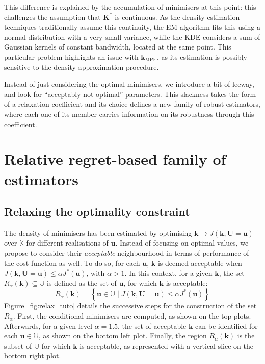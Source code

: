 \documentclass[preprint, 1p]{elsarticle}
\newcommand{\kmpe}{{\mathbf{k}}_{\mathrm{MPE}}}
\newcommand{\Kspace}{\mathbb{K}}
\newcommand{\Uspace}{\mathbb{U}}
\newcommand{\elise}[1]{{\itshape\color{red} ({#1})}}
\begin{document}
This difference is explained by the accumulation of minimisers at this point: this challenges the assumption that $\mathbf{K}^*$ is continuous. As the density estimation techniques traditionally assume this continuity, the EM algorithm fits this using a normal distribution with a very small variance, while the KDE considers a sum of Gaussian kernels of constant bandwidth, located at the same point. This particular problem highlights an issue with $\kmpe$, as its estimation is possibly sensitive to the density approximation procedure.


Instead of just considering the optimal minimisers, we introduce a bit of leeway, and look for ``acceptably not optimal'' parameters.
 This slackness takes the form of a relaxation coefficient and its choice defines a new family of robust estimators, where each one of its member carries information on its robustness through this coefficient.




\section{Relative regret-based family of estimators}%
\label{sec:relax_constraint}
\subsection{Relaxing the optimality constraint}
The density of minimisers has been estimated by optimising $\mathbf{k}\mapsto J(\mathbf{k},\mathbf{U}=\mathbf{u})$ over $\Kspace$ for different realisations of $\mathbf{u}$. Instead of focusing on optimal values, we propose to consider their {\it acceptable} neighbourhood in terms of performance of the cost function as well.
To do so, for each $\mathbf{u}$, $\mathbf{k}$ is deemed acceptable when  $J(\mathbf{k},\mathbf{U}=\mathbf{u}) \leq \alpha J^*(\mathbf{u})$, with $\alpha > 1$. 
%
%
In this context, for a given $\mathbf{k}$, the set $R_{\alpha}(\mathbf{k}) \subseteq \Uspace$ is defined as the set of $\mathbf{u}$, for which $\mathbf{k}$ is acceptable:
\begin{equation}
\label{eq:def_Ralpha}
R_{\alpha}(\mathbf{k}) = \left\{ \mathbf{u} \in \Uspace \mid J(\mathbf{k},\mathbf{U}=\mathbf{u}) \leq \alpha J^*(\mathbf{u}) \right\}
\end{equation}
Figure~\ref{fig:relax_tuto} details the successive steps for the construction of the set $R_{\alpha}$. First, the conditional minimisers are computed, as shown on the top plots. Afterwards, for a given level $\alpha=1.5$, the set of acceptable $\mathbf{k}$ can be identified for each $\mathbf{u} \in \Uspace$, as shown on the bottom left plot. Finally, the region $R_{\alpha}(\mathbf{k})$ is the subset of $\Uspace$ for which $\mathbf{k}$ is acceptable, as represented with a vertical slice on the bottom right plot.
\end{document}
